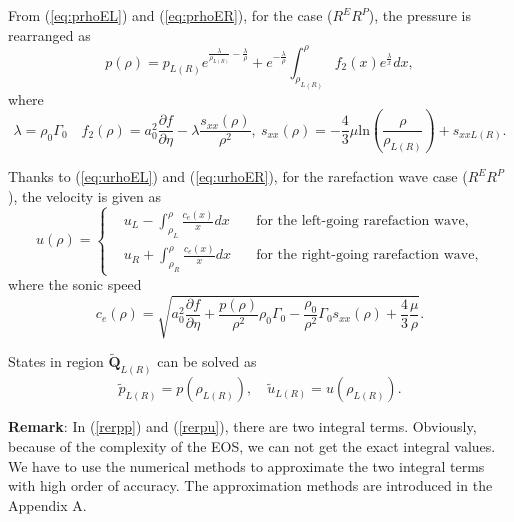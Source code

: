 \documentclass{article}
\numberwithin{equation}{section}
\numberwithin{table}{section}
\begin{document}
From (\ref{eq:prhoEL}) and (\ref{eq:prhoER}), for the case ($R^{E}R^{P}$), the pressure is rearranged as
\begin{equation}\label{rerpp}
  p(\rho)=
	  p_{L(R)}e^{\frac{\lambda}{\rho_{L(R)}}-\frac{\lambda}{\rho}} +e^{-\frac{\lambda}{\rho}}\int_{\rho_{L(R)}}^{\rho} f_2(x) e^{\frac{\lambda}{x}}dx, %
\end{equation}
where
\begin{equation}
  \lambda = \rho_0 \Gamma_0 \quad f_2(\rho) = a_0^2\frac{\partial f}{\partial \eta}- \lambda\frac{s_{xx}(\rho)}{\rho^2}, \ s_{xx}(\rho) =	 -\frac{4}{3}\mu\text{ln}\left(\frac{\rho}{\rho_{L(R)}}\right)+s_{xxL(R)}.
\end{equation}


Thanks to (\ref{eq:urhoEL}) and (\ref{eq:urhoER}), for the rarefaction wave case ($R^{E}R^{P}$), the velocity is given as
\begin{equation} \label{rerpu}
  u(\rho) =\left\{ \begin{aligned}
	&u_L - \int_{\rho_L}^{\rho} \frac{c_e(x)}{x} dx \quad  & \text{for the  left-going rarefaction wave}
 , \\
 &u_R + \int_{\rho_R}^{\rho} \frac{c_e(x)}{x} dx \quad &  \text{for the right-going rarefaction wave} ,
	\end{aligned}
  \right. %
\end{equation}
where the sonic speed
\begin{equation}
  c_e(\rho) =
	  \sqrt{a_0^2 \frac{\partial f}{\partial \eta} + \frac{p(\rho)}{\rho^2}\rho_0\Gamma_0 -\frac{\rho_0}{\rho^2}\Gamma_0 s_{xx}(\rho) +\frac{4}{3}\frac{\mu}{\rho}}. %
\end{equation}

States in region $\tilde{\mathbf{Q}}_{L(R)}$ can be solved as
\begin{equation}
  \tilde{p}_{L(R)} = p(\rho_{L(R)}), \quad \tilde{u}_{L(R)} = u(\rho_{L(R)}).
\end{equation}

\textbf{Remark}:  In (\ref{rerpp}) and (\ref{rerpu}), there are two integral terms. Obviously, because of the complexity of the EOS, we can not get the exact integral values. We have to use the numerical methods to approximate the two integral terms with high order of accuracy. The approximation methods are introduced in the Appendix A. 
\end{document}
